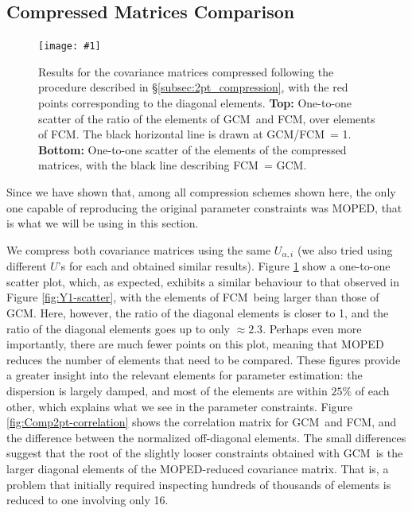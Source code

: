 \documentclass[twocolumn]{\docclass}
\newcommand{\sfig}[2]{
	\texttt{[image: \#1]}
}
\newcommand{\rf}[1]{Figure \ref{fig:#1}}
\newcommand{\rssec}[1]{\S\ref{subsec:#1}}
\newcommand\full{FCM}
\newcommand\gaussian{GCM}
\begin{document}
	\subsection{Compressed Matrices Comparison}
	\label{subsec:compare_compressed}
	
	\begin{figure}[b]
		\sfig{Comp2pt-scatter}{0.85\columnwidth}
		\caption{{\small Results for the covariance matrices compressed following the procedure described in \rssec{2pt_compression}, with the red points corresponding to the diagonal elements.
		\textbf{Top:}  One-to-one scatter of the ratio of the elements of \gaussian\ and \full, over elements of \full. The black horizontal line is drawn at \gaussian/\full\ = 1.
		\textbf{Bottom:}  One-to-one scatter of the elements of the compressed matrices, with the black line describing \full\ = \gaussian.}}
		\label{fig:Comp2pt-scatter}
	\end{figure}
	
	Since we have shown that, among all compression schemes shown here, the only one capable of reproducing the original parameter constraints was MOPED, that is what we will be using in this section.
	
	We compress both covariance matrices using the same $U_{\alpha, i}$ (we also tried using different $U$'s for each and obtained similar results).
	\rf{Comp2pt-scatter} show a one-to-one scatter plot, which, as expected, exhibits a similar behaviour to that observed in \rf{Y1-scatter}, with the elements of \full\ being larger than those of \gaussian. Here, however, the ratio of the diagonal elements is closer to 1, and the ratio of the diagonal elements goes up to only $\approx 2.3$. Perhaps even more importantly, there are much fewer points on this plot, meaning that MOPED reduces the number of elements that need to be compared. These figures provide a greater insight into the relevant elements for parameter estimation: the dispersion is largely damped, and most of the elements are within $25\%$ of each other, which explains what we see in the parameter constraints. \rf{Comp2pt-correlation} shows the correlation matrix for \gaussian\ and \full, and the difference between the normalized off-diagonal elements. The small differences suggest that the root of the slightly looser constraints obtained with \gaussian\ is the larger diagonal elements of the MOPED-reduced covariance matrix. That is, a problem that initially required inspecting hundreds of thousands of elements is reduced to one involving only 16.
	
\end{document}
